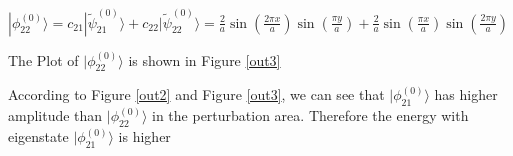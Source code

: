 \documentclass[12pt]{article}
\begin{document}
\begin{spacing}{2.0}
$|\phi_{22}^{(0)} \rangle= c_{21}|\widetilde{\psi}_{21}^{(0)}\rangle + c_{22}|\widetilde{\psi}_{22}^{(0)}\rangle = \frac{2}{a} \sin(\frac{2\pi x}{a}) \sin(\frac{\pi y}{a})+ \frac{2}{a}\sin(\frac{\pi x}{a}) \sin(\frac{2\pi y}{a})$

The Plot of $|\phi_{22}^{(0)} \rangle$ is shown in Figure \ref{out3}

According to Figure \ref{out2} and Figure \ref{out3}, we can see that $|\phi_{21}^{(0)} \rangle$ has higher amplitude than $|\phi_{22}^{(0)} \rangle$ in the perturbation area. Therefore the energy with eigenstate $|\phi_{21}^{(0)} \rangle$ is higher

\end{spacing}
\end{document}
